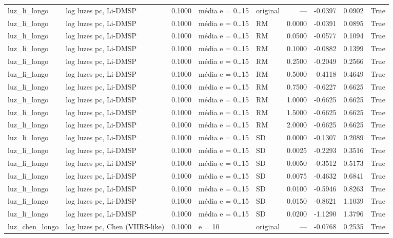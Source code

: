 \begin{table}
{\begin{tabular}{llrllrrrr}
luz\_li\_longo & log luzes pc, Li-DMSP & 0.1000 & média e = 0…15 & original & — & -0.0397 & 0.0902 & True \\
luz\_li\_longo & log luzes pc, Li-DMSP & 0.1000 & média e = 0…15 & RM & 0.0000 & -0.0391 & 0.0895 & True \\
luz\_li\_longo & log luzes pc, Li-DMSP & 0.1000 & média e = 0…15 & RM & 0.0500 & -0.0577 & 0.1094 & True \\
luz\_li\_longo & log luzes pc, Li-DMSP & 0.1000 & média e = 0…15 & RM & 0.1000 & -0.0882 & 0.1399 & True \\
luz\_li\_longo & log luzes pc, Li-DMSP & 0.1000 & média e = 0…15 & RM & 0.2500 & -0.2049 & 0.2566 & True \\
luz\_li\_longo & log luzes pc, Li-DMSP & 0.1000 & média e = 0…15 & RM & 0.5000 & -0.4118 & 0.4649 & True \\
luz\_li\_longo & log luzes pc, Li-DMSP & 0.1000 & média e = 0…15 & RM & 0.7500 & -0.6227 & 0.6625 & True \\
luz\_li\_longo & log luzes pc, Li-DMSP & 0.1000 & média e = 0…15 & RM & 1.0000 & -0.6625 & 0.6625 & True \\
luz\_li\_longo & log luzes pc, Li-DMSP & 0.1000 & média e = 0…15 & RM & 1.5000 & -0.6625 & 0.6625 & True \\
luz\_li\_longo & log luzes pc, Li-DMSP & 0.1000 & média e = 0…15 & RM & 2.0000 & -0.6625 & 0.6625 & True \\
luz\_li\_longo & log luzes pc, Li-DMSP & 0.1000 & média e = 0…15 & SD & 0.0000 & -0.1307 & 0.2089 & True \\
luz\_li\_longo & log luzes pc, Li-DMSP & 0.1000 & média e = 0…15 & SD & 0.0025 & -0.2293 & 0.3516 & True \\
luz\_li\_longo & log luzes pc, Li-DMSP & 0.1000 & média e = 0…15 & SD & 0.0050 & -0.3512 & 0.5173 & True \\
luz\_li\_longo & log luzes pc, Li-DMSP & 0.1000 & média e = 0…15 & SD & 0.0075 & -0.4632 & 0.6841 & True \\
luz\_li\_longo & log luzes pc, Li-DMSP & 0.1000 & média e = 0…15 & SD & 0.0100 & -0.5946 & 0.8263 & True \\
luz\_li\_longo & log luzes pc, Li-DMSP & 0.1000 & média e = 0…15 & SD & 0.0150 & -0.8621 & 1.1039 & True \\
luz\_li\_longo & log luzes pc, Li-DMSP & 0.1000 & média e = 0…15 & SD & 0.0200 & -1.1290 & 1.3796 & True \\
luz\_chen\_longo & log luzes pc, Chen (VIIRS-like) & 0.1000 & e = 10 & original & — & -0.0768 & 0.2535 & True \\

\end{tabular}}
\end{table}
